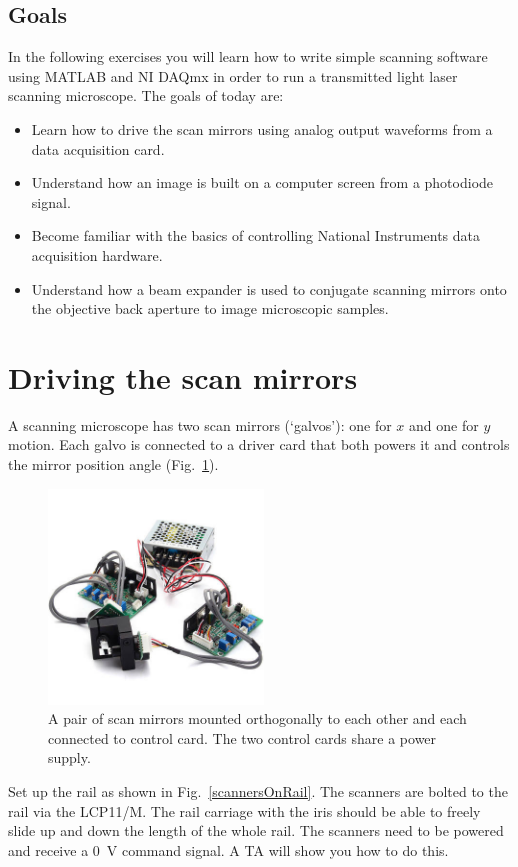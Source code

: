 \documentclass[a4paper]{report}
\begin{document}
\subsection{Goals}
In the following exercises you will learn how to write simple scanning software using MATLAB and NI DAQmx in order to run a transmitted light laser scanning microscope. 
The goals of today are:
\begin{itemize}
\setlength\itemsep{0.15em}
\item Learn how to drive the scan mirrors using analog output waveforms from a data acquisition card. 
\item Understand how an image is built on a computer screen from a photodiode signal. 
\item Become familiar with the basics of controlling National Instruments data acquisition hardware.
\item Understand how a beam expander is used to conjugate scanning mirrors onto the objective back aperture to image microscopic samples.
\end{itemize}

\clearpage


\section{Driving the scan mirrors}
A scanning microscope has two scan mirrors (`galvos'): one for $x$ and one for $y$ motion.
Each galvo is connected to a driver card that both powers it and controls the mirror position angle (Fig.~\ref{scanners}). 


\begin{figure}[h]
\centering
\includegraphics[width=2.25in]{scanners.png}
\caption{A pair of scan mirrors mounted orthogonally to each other and each connected to control card. The two control cards share a power supply.}
\label{scanners}
\end{figure}

Set up the rail as shown in Fig.~\ref{scannersOnRail}.
The scanners are bolted to the rail via the LCP11/M.
The rail carriage with the iris should be able to freely slide up and down the length of the whole rail.
The scanners need to be powered and receive a 0~V command signal. 
A TA will show you how to do this. 
\end{document}
